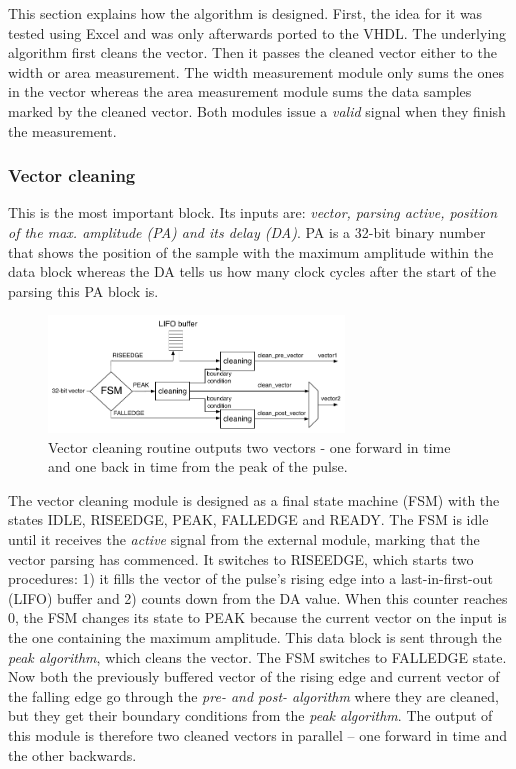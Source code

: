 \documentclass[12pt]{mytustyle}  %
\begin{document}
This section explains how the algorithm is designed. First, the idea for it was tested using Excel and was only afterwards ported to the VHDL. The underlying algorithm first cleans the vector. Then it passes the cleaned vector either to the width or area measurement. The width measurement module only sums the ones in the vector whereas the area measurement module sums the data samples marked by the cleaned vector. Both modules issue a \emph{valid} signal when they finish the measurement.


 
\subsubsection{Vector cleaning}
This is the most important block. Its inputs are: \emph{vector, parsing active, position of the max. amplitude (PA) and its delay (DA)}. PA is a 32-bit binary number that shows the position of the sample with the maximum amplitude within the data block whereas the DA tells us how many clock cycles after the start of the parsing this PA block is.
\begin{figure}[!ht]
\centering
\includegraphics[width=0.7\textwidth]{plots/vector_clean}
\caption{Vector cleaning routine outputs two vectors - one forward in time and one back in time from the peak of the pulse.}
\label{fig:routine}
\end{figure}
The vector cleaning module is designed as a final state machine (FSM) with the states IDLE, RISEEDGE, PEAK, FALLEDGE and READY.  The FSM is idle until it receives the \emph{active} signal from the external module, marking that the vector parsing has commenced. It switches to RISEEDGE, which starts two procedures: 1) it fills the vector of the pulse's rising edge into a last-in-first-out (LIFO) buffer and 2) counts down from the DA value. When this counter reaches 0, the FSM changes its state to PEAK because the current vector on the input is the one containing the maximum amplitude. This data block is sent through the \emph{peak algorithm}, which cleans the vector. The FSM switches to FALLEDGE state. Now both the previously buffered vector of the rising edge and current vector of the falling edge go through the \emph{pre- and post- algorithm} where they are cleaned, but they get their boundary conditions from the \emph{peak algorithm}. The output of this module is therefore two cleaned vectors in parallel -- one forward in time and the other backwards.
\end{document}
